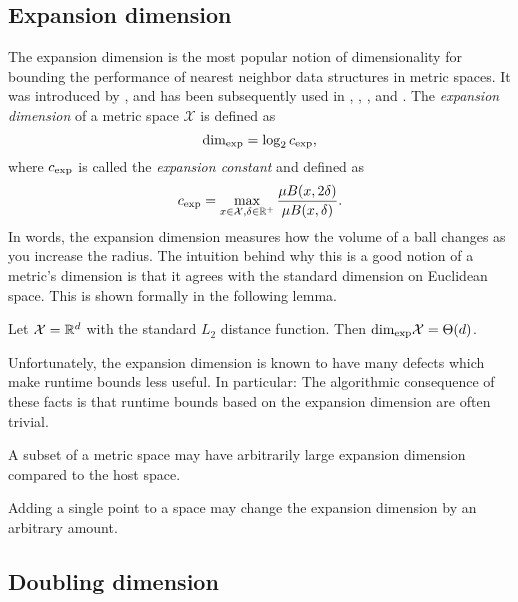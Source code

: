 \documentclass[../main.tex]{subfiles}
\newcommand{\set}[1]{\mathcal {#1}}
\newcommand{\krdim}{\text{dim}_\textnormal{exp}}
\newcommand{\cexp}{c_\textnormal{exp}}
\begin{document}

\subsection{Expansion dimension}

The expansion dimension is the most popular notion of dimensionality for bounding the performance of nearest neighbor data structures in metric spaces.
It was introduced by
\citet{karger2002finding},
and has been subsequently used in
\citet{krauthgamer2004navigating},
\citet{beygelzimer2006cover},
\citet{ram2009linear},
and \citet{curtin2015plug}.
The \emph{expansion dimension} of a metric space $\set X$ is defined as
\begin{equation}
    \krdim = \log_2 \cexp
    ,
\end{equation}
where $\cexp$ is called the \emph{expansion constant} and defined as
\begin{equation}
    \cexp = \max_{x\in\set X, \delta\in\R^+} \frac{\mu B(x,2\delta)}{\mu B(x,\delta)}
    .
\end{equation}
In words, the expansion dimension measures how the volume of a ball changes as you increase the radius.
The intuition behind why this is a good notion of a metric's dimension is that it agrees with the standard dimension on Euclidean space.
This is shown formally in the following lemma.
\begin{lemma}
    Let $\set X=\R^d$ with the standard $L_2$ distance function.
    Then $\krdim\set X=\Theta(d)$.
\end{lemma}
Unfortunately, the expansion dimension is known to have many defects which make runtime bounds less useful.
In particular:
The algorithmic consequence of these facts is that runtime bounds based on the expansion dimension are often trivial.

\begin{example}
    A subset of a metric space may have arbitrarily large expansion dimension compared to the host space.
\end{example}

\begin{example}
    Adding a single point to a space may change the expansion dimension by an arbitrary amount.
\end{example}


\subsection{Doubling dimension}
\end{document}
